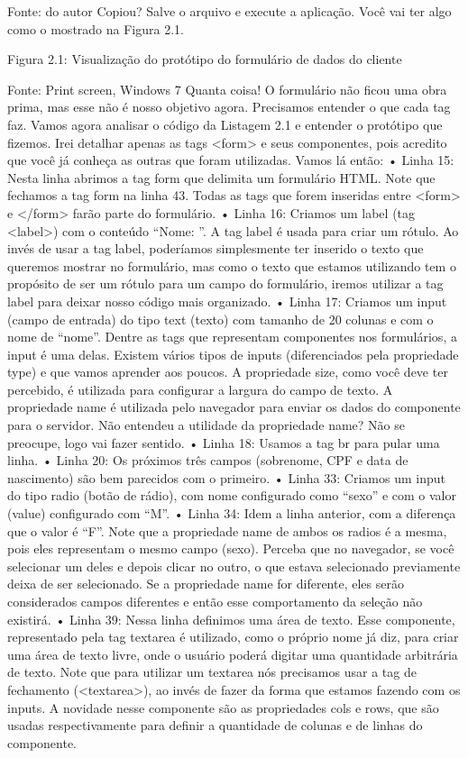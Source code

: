 Fonte: do autor
Copiou? Salve o arquivo e execute a aplicação. Você vai ter algo como o mostrado na Figura 2.1.

Figura 2.1: Visualização do protótipo do formulário de dados do cliente
 
Fonte: Print screen, Windows 7
Quanta coisa! O formulário não ficou uma obra prima, mas esse não é nosso objetivo agora. Precisamos entender o que cada tag faz. Vamos agora analisar o código da Listagem 2.1 e entender o protótipo que fizemos. Irei detalhar apenas as tags <form> e seus componentes, pois acredito que você já conheça as outras que foram utilizadas. Vamos lá então:
•	Linha 15: Nesta linha abrimos a tag form que delimita um formulário HTML. Note que fechamos a tag form na linha 43. Todas as tags que forem inseridas entre <form> e </form> farão parte do formulário.
•	Linha 16: Criamos um label (tag <label>) com o conteúdo “Nome: ”. A tag label é usada para criar um rótulo. Ao invés de usar a tag label, poderíamos simplesmente ter inserido o texto que queremos mostrar no formulário, mas como o texto que estamos utilizando tem o propósito de ser um rótulo para um campo do formulário, iremos utilizar a tag label para deixar nosso código mais organizado.
•	Linha 17: Criamos um input (campo de entrada) do tipo text (texto) com tamanho de 20 colunas e com o nome de “nome”. Dentre as tags que representam componentes nos formulários, a input é uma delas. Existem vários tipos de inputs (diferenciados pela propriedade type) e que vamos aprender aos poucos. A propriedade size, como você deve ter percebido, é utilizada para configurar a largura do campo de texto. A propriedade name é utilizada pelo navegador para enviar os dados do componente para o servidor. Não entendeu a utilidade da propriedade name? Não se preocupe, logo vai fazer sentido.
•	Linha 18: Usamos a tag br para pular uma linha.
•	Linha 20: Os próximos três campos (sobrenome, CPF e data de nascimento) são bem parecidos com o primeiro.
•	Linha 33: Criamos um input do tipo radio (botão de rádio), com nome configurado como “sexo” e com o valor (value) configurado com “M”.
•	Linha 34: Idem a linha anterior, com a diferença que o valor é “F”. Note que a propriedade name de ambos os radios é a mesma, pois eles representam o mesmo campo (sexo). Perceba que no navegador, se você selecionar um deles e depois clicar no outro, o que estava selecionado previamente deixa de ser selecionado. Se a propriedade name for diferente, eles serão considerados campos diferentes e então esse comportamento da seleção não existirá.
•	Linha 39: Nessa linha definimos uma área de texto. Esse componente, representado pela tag textarea é utilizado, como o próprio nome já diz, para criar uma área de texto livre, onde o usuário poderá digitar uma quantidade arbitrária de texto. Note que para utilizar um textarea nós precisamos usar a tag de fechamento (<textarea>), ao invés de fazer da forma que estamos fazendo com os inputs. A novidade nesse componente são as propriedades cols e rows, que são usadas respectivamente para definir a quantidade de colunas e de linhas do componente.
